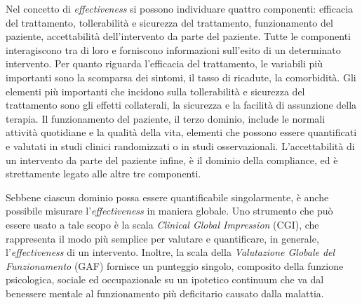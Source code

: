 Nel concetto di \emph{effectiveness} si possono individuare quattro componenti: efficacia del trattamento, tollerabilità e sicurezza del trattamento, funzionamento del paziente, accettabilità dell'intervento da parte del paziente. 
Tutte le componenti interagiscono tra di loro e forniscono informazioni sull'esito di un determinato intervento.
Per quanto riguarda l'efficacia del trattamento, le variabili più importanti sono la scomparsa dei sintomi, il tasso di ricadute, la comorbidità. 
Gli elementi più importanti che incidono sulla tollerabilità e sicurezza del trattamento sono gli effetti collaterali, la sicurezza e la facilità di assunzione della terapia. 
Il funzionamento del paziente, il terzo dominio, include le normali attività quotidiane e la qualità della vita, elementi che possono essere quantificati e valutati in studi clinici randomizzati o in studi osservazionali. 
L'accettabilità di un intervento da parte del paziente infine, è il dominio della compliance, ed è strettamente legato alle altre tre componenti.

Sebbene ciascun dominio possa essere quantificabile singolarmente, è anche possibile misurare l'\emph{effectiveness} in maniera globale. 
Uno strumento che può essere usato a tale scopo è la scala \emph{Clinical Global Impression} (CGI), che rappresenta il modo più semplice per valutare e quantificare, in generale, l'\emph{effectiveness} di un intervento. 
Inoltre, la scala della \emph{Valutazione Globale del Funzionamento} (GAF) fornisce un punteggio singolo, composito della funzione psicologica, sociale ed occupazionale su un ipotetico continuum che va dal benessere mentale al funzionamento più deficitario causato dalla malattia. 


